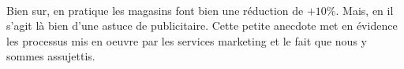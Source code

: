 \documentclass{article}
\begin{document}
\paragraph*{}
Bien sur, en pratique les magasins font bien une réduction de $+10\%$. Mais, en 
il s'agit là bien d'une astuce de publicitaire. 
Cette petite anecdote met en évidence les processus mis en oeuvre par les 
services marketing et le fait que nous y sommes assujettis. 
\end{document}
